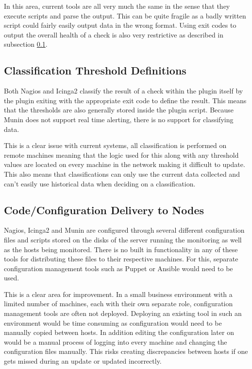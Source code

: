 \documentclass[bsc,logo,twoside,parskip,singlespacing,notimes]{infthesis}
\begin{document}
	In this area, current tools are all very much the same in the sense that they
	execute scripts and parse the output. This can be quite fragile as a badly
	written script could fairly easily output data in the wrong format. Using exit
	codes to output the overall health of a check is also very restrictive as
	described in subsection \ref{classification-threshold-definitions}.

\subsection{Classification Threshold Definitions}
\label{classification-threshold-definitions}

	Both Nagios and Icinga2 classify the result of a check within the plugin itself
	by the plugin exiting with the appropriate exit code to define the result. This
	means that the thresholds are also generally stored inside the plugin script.
	Because Munin does not support real time alerting, there is no support for
	classifying data.


	This is a clear issue with current systems, all classification is performed on
	remote machines meaning that the logic used for this along with any threshold
	values are located on every machine in the network making it difficult to
	update. This also means that classifications can only use the current data
	collected and can't easily use historical data when deciding on a
	classification.

\subsection{Code/Configuration Delivery to Nodes}

	Nagios, Icinga2 and Munin are configured through several different
	configuration files and scripts stored on the disks of the server running the
	monitoring as well as the hosts being monitored.  There is no built in
	functionality in any of these tools for distributing these files to their
	respective machines.  For this, separate configuration management tools such as
	Puppet or Ansible would need to be used.


	This is a clear area for improvement. In a small business environment with a
	limited number of machines, each with their own separate role, configuration
	management tools are often not deployed.  Deploying an existing tool
	in such an environment would be time consuming as configuration would need
	to be manually copied between hosts. In addition editing the configuration later on
	would be a manual process of logging into every machine and changing the
	configuration files manually. This risks creating discrepancies between
	hosts if one gets missed during an update or updated incorrectly.
\end{document}
